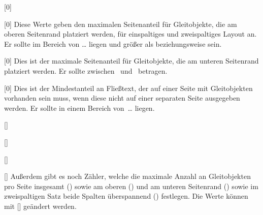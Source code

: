 \begin{Declaration}{}[0\topfraction]
\begin{Declaration}{}[0\dbltopfraction]
\printdeclarationlist%
%
Diese Werte geben den maximalen Seitenanteil für Gleitobjekte, die am oberen 
Seitenrand platziert werden, für einspaltiges und zweispaltiges Layout an. Er 
sollte im Bereich von \dots{} liegen und größer als 
 beziehungsweise  sein.
\end{Declaration}
\end{Declaration}

\begin{Declaration}{}[0\bottomfraction]
\printdeclarationlist%
%
Dies ist der maximale Seitenanteil für Gleitobjekte, die am unteren Seitenrand 
platziert werden. Er sollte zwischen~ und~ betragen.
\end{Declaration}

\begin{Declaration}{}[0\textfraction]
\printdeclarationlist%
%
Dies ist der Mindestanteil an Fließtext, der auf einer Seite mit Gleitobjekten 
vorhanden sein muss, wenn diese nicht auf einer separaten Seite ausgegeben 
werden. Er sollte in einem Bereich von~\dots{} liegen.
\end{Declaration}

\begin{Declaration}{}[]
\begin{Declaration}{}[]
\begin{Declaration}{}[]
\begin{Declaration}{}[]
\printdeclarationlist%
%
Außerdem gibt es noch Zähler, welche die maximale Anzahl an Gleitobjekten pro 
Seite insgesamt () sowie am oberen () 
und am unteren Seitenrand () sowie im zweispaltigen 
Satz beide Spalten überspannend () festlegen. Die Werte 
können mit [] geändert 
werden.
\end{Declaration}
\end{Declaration}
\end{Declaration}
\end{Declaration}

